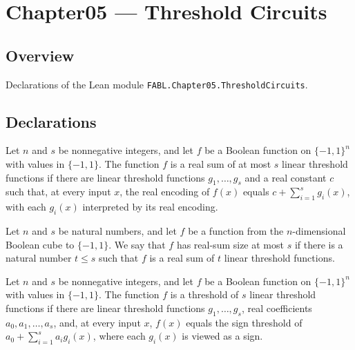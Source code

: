 \chapter{Chapter05 — Threshold Circuits}
\section{Overview}

Declarations of the Lean module \texttt{FABL.Chapter05.ThresholdCircuits}.

\section{Declarations}

\begin{definition}
\label{FABL.IsRealSumOfLinearThresholds}
\leanok
{}
Let $n$ and $s$ be nonnegative integers, and let $f$ be a Boolean function on
$\{-1,1\}^n$ with values in $\{-1,1\}$. The function $f$ is a real sum of at most
$s$ linear threshold functions if there are linear threshold functions $g_1,\ldots,g_s$
and a real constant $c$ such that, at every input $x$, the real encoding of $f(x)$
equals $c+\sum_{i=1}^s g_i(x)$, with each $g_i(x)$ interpreted by its real encoding.
\end{definition}

\begin{definition}
\label{FABL.HasRealSumOfLinearThresholdsSizeAtMost}
\leanok
{}
Let $n$ and $s$ be natural numbers, and let $f$ be a function from the $n$-dimensional
Boolean cube to $\{ -1,1 \}$. We say that $f$ has real-sum size at most $s$ if there
is a natural number $t\le s$ such that $f$ is a real sum of $t$ linear threshold
functions.
\end{definition}

\begin{definition}
\label{FABL.IsThresholdOfThresholds}
\leanok
{}
Let $n$ and $s$ be nonnegative integers, and let $f$ be a Boolean function on
$\{-1,1\}^n$ with values in $\{-1,1\}$. The function $f$ is a threshold of $s$
linear threshold functions if there are linear threshold functions $g_1,\ldots,g_s$,
real coefficients $a_0,a_1,\ldots,a_s$, and, at every input $x$, $f(x)$ equals the sign
threshold of $a_0+\sum_{i=1}^s a_i g_i(x)$, where each $g_i(x)$ is viewed as a sign.
\end{definition}

